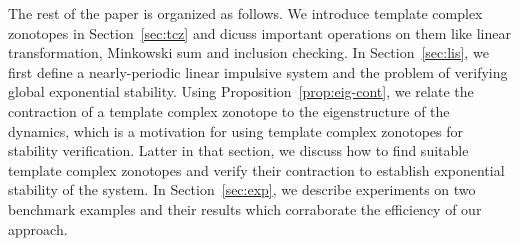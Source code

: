 The rest of the paper is organized as follows.  We introduce template
complex zonotopes in Section~\ref{sec:tcz} and dicuss important
operations on them like linear transformation, Minkowski sum and
inclusion checking.  In Section~\ref{sec:lis}, we first define a
nearly-periodic linear impulsive system and the problem of verifying
global exponential stability.  Using Proposition~\ref{prop:eig-cont},
we relate the contraction of a template complex zonotope to the
eigenstructure of the dynamics, which is a motivation for using
template complex zonotopes for stability verification.  Latter in that
section, we discuss how to find suitable template complex zonotopes
and verify their contraction to establish exponential stability of the
system.  In Section~\ref{sec:exp}, we describe experiments on two
benchmark examples and their results which corraborate the efficiency
of our approach.










